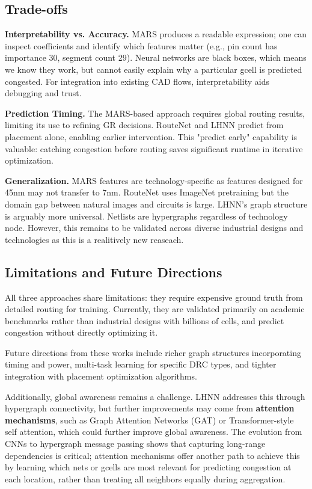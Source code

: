 \documentclass[sigconf]{acmart}
\begin{document}
\subsection{Trade-offs}

\textbf{Interpretability vs. Accuracy.} MARS produces a readable 
expression; one can inspect coefficients and identify which features 
matter (e.g., pin count has importance 30, segment count 29). Neural 
networks are black boxes, which means we know they work, but cannot easily explain 
why a particular gcell is predicted congested. For integration into 
existing CAD flows, interpretability aids debugging and trust.

\textbf{Prediction Timing.} The MARS-based approach requires global 
routing results, limiting its use to refining GR decisions. RouteNet 
and LHNN predict from placement alone, enabling earlier intervention. 
This "predict early" capability is valuable: catching congestion before 
routing saves significant runtime in iterative optimization.

\textbf{Generalization.} MARS features are technology-specific as features 
designed for 45nm may not transfer to 7nm. RouteNet uses ImageNet 
pretraining but the domain gap between natural images and circuits 
is large. LHNN's graph structure is arguably more universal. Netlists 
are hypergraphs regardless of technology node. However, this remains to be validated across 
diverse industrial designs and technologies as this is a realitively new reaseach.


\subsection{Limitations and Future Directions}

All three approaches share limitations: they require expensive ground 
truth from detailed routing for training. Currently, they are validated primarily on 
academic benchmarks rather than industrial designs with billions of 
cells, and predict congestion without directly optimizing it. 

Future directions from these works include richer graph structures incorporating timing 
and power, multi-task learning for specific DRC types, and tighter 
integration with placement optimization algorithms. 

Additionally, global awareness remains a challenge. LHNN addresses this through 
hypergraph connectivity, but further improvements may come from \textbf{attention mechanisms}, such as Graph Attention Networks \cite{velickovic2018gat} (GAT) or 
Transformer-style self attention, which could further improve global awareness. 
The evolution from CNNs to hypergraph message passing shows that 
capturing long-range dependencies is critical; attention mechanisms 
offer another path to achieve this by learning which nets or gcells 
are most relevant for predicting congestion at each location, rather 
than treating all neighbors equally during aggregation.
\end{document}
